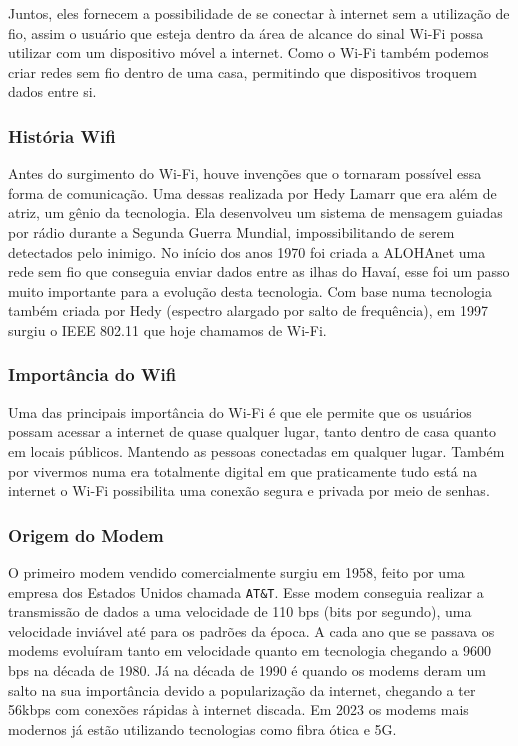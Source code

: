 \documentclass[12pt,a4, oneside, brazil]{article}
\begin{document}
Juntos, eles fornecem a possibilidade de se conectar à internet sem a utilização de fio, assim o usuário que esteja dentro da área de alcance do sinal Wi-Fi possa utilizar com um dispositivo móvel a internet. Como o Wi-Fi também podemos criar redes sem fio dentro de uma casa, permitindo que dispositivos troquem dados entre si.

\subsubsection{História Wifi}
Antes do surgimento do Wi-Fi, houve invenções que o tornaram possível essa forma de comunicação. Uma dessas realizada por Hedy Lamarr que era além de atriz, um gênio da tecnologia. Ela desenvolveu um sistema de mensagem guiadas por rádio durante a Segunda Guerra Mundial, impossibilitando de serem detectados pelo inimigo. No início dos anos 1970 foi criada a ALOHAnet uma rede sem fio que conseguia enviar dados entre as ilhas do Havaí, esse foi um passo muito importante para a evolução desta tecnologia. Com base numa tecnologia também criada por Hedy (espectro alargado por salto de frequência), em 1997 surgiu o IEEE 802.11 que hoje chamamos de Wi-Fi.

\subsubsection{Importância do Wifi}
Uma das principais importância do Wi-Fi é que ele permite que os usuários possam acessar a internet de quase qualquer lugar, tanto dentro de casa quanto em locais públicos. Mantendo as pessoas conectadas em qualquer lugar. Também por vivermos numa era totalmente digital em que praticamente tudo está na internet o Wi-Fi possibilita uma conexão segura e privada por meio de senhas.

\subsubsection{Origem do Modem}
O primeiro modem vendido comercialmente surgiu em 1958, feito por uma empresa dos Estados Unidos chamada \verb*|AT&T|. Esse modem conseguia realizar a transmissão de dados a uma velocidade de 110 bps (bits por segundo), uma velocidade inviável até para os padrões da época. A cada ano que se passava os modems evoluíram tanto em velocidade quanto em tecnologia chegando a 9600 bps na década de 1980. Já na década de 1990 é quando os modems deram um salto na sua importância devido a popularização da internet, chegando a ter 56kbps com conexões rápidas à internet discada. Em 2023 os modems mais modernos já estão utilizando tecnologias como fibra ótica e 5G.
\end{document}
